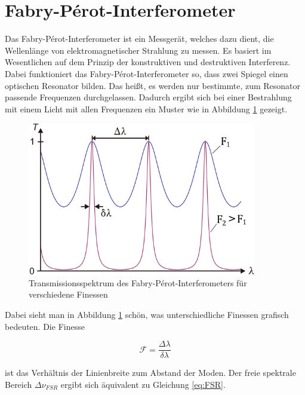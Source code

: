 \section{Fabry-Pérot-Interferometer}
\label{section:Fabry}

Das Fabry-Pérot-Interferometer ist ein Messgerät, welches dazu dient, die Wellenlänge 
von elektromagnetischer Strahlung zu messen. Es basiert im Wesentlichen auf
dem Prinzip der konstruktiven und destruktiven Interferenz. 
Dabei funktioniert das Fabry-Pérot-Interferometer so, dass zwei Spiegel einen optischen
Resonator bilden. Das heißt, es werden nur bestimmte, zum Resonator passende Frequenzen durchgelassen. Dadurch 
ergibt sich bei einer Bestrahlung mit einem Licht mit allen Frequenzen ein Muster wie in Abbildung
 \ref{bild:Fabry} gezeigt. 

\begin{figure}[ht]
    \centering
    \includegraphics[width = 10cm]{Bilder/Auswertung/Finesse.png}
    \caption{Transmissionsspektrum des Fabry-Pérot-Interferometers für verschiedene Finessen }
    \label{bild:Fabry}
\end{figure}

Dabei sieht man in Abbildung \ref{bild:Fabry} schön, was unterschiedliche Finessen grafisch bedeuten.
Die Finesse 

\begin{equation}
    \mathcal{F} = \frac{\Delta \lambda}{\delta \lambda}
\end{equation}

ist das Verhältnis der Linienbreite zum Abstand der Moden. Der freie 
spektrale Bereich $\Delta \nu_{FSR}$ ergibt sich äquivalent zu Gleichung \ref{eq:FSR}. 